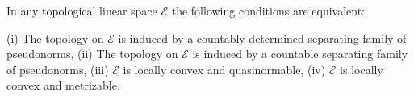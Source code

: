 In any topological linear space $\mathcal{E}$ the following conditions are equivalent:

(i) The topology on $\mathcal{E}$ is induced by a countably determined separating family of pseudonorms,
(ii) The topology on $\mathcal{E}$ is induced by a countable separating family of pseudonorms,
(iii) $\mathcal{E}$ is locally convex and quasinormable,
(iv) $\mathcal{E}$ is locally convex and metrizable.
